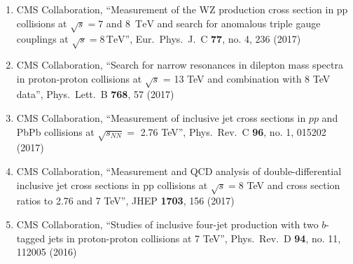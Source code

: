 \begin{enumerate}
\item CMS Collaboration, ``Measurement of the WZ production cross section in pp collisions at $\sqrt{s} = 7$ and 8 $\,\text{TeV}$ and search for anomalous triple gauge couplings at $\sqrt{s} = 8\,\text{TeV} $'', Eur.\ Phys.\ J.\ C {\bf 77}, no. 4, 236 (2017)

\item CMS Collaboration, ``Search for narrow resonances in dilepton mass spectra in proton-proton collisions at $\sqrt{s}$ = 13 TeV and combination with 8 TeV data'', Phys.\ Lett.\ B {\bf 768}, 57 (2017)

\item CMS Collaboration, ``Measurement of inclusive jet cross sections in $pp$ and PbPb collisions at $\sqrt{s_{NN}}=$ 2.76 TeV'', Phys.\ Rev.\ C {\bf 96}, no. 1, 015202 (2017)

\item CMS Collaboration, ``Measurement and QCD analysis of double-differential inclusive jet cross sections in pp collisions at $ \sqrt{s}=8 $ TeV and cross section ratios to 2.76 and 7 TeV'', JHEP {\bf 1703}, 156 (2017)

\item CMS Collaboration, ``Studies of inclusive four-jet production with two $b$-tagged jets in proton-proton collisions at 7 TeV'', Phys.\ Rev.\ D {\bf 94}, no. 11, 112005 (2016)


\end{enumerate}

